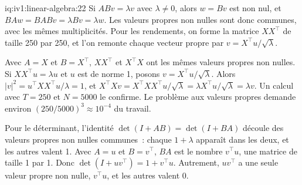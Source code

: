 \begin{solution}{iq:iv1:linear-algebra:22}
Si $ABv = \lambda v$ avec $\lambda \ne 0$, alors $w = Bv$ est non nul, et $BAw = BABv = \lambda Bv = \lambda w$. Les valeurs propres non nulles sont donc communes, avec les mêmes multiplicités. Pour les rendements, on forme la matrice $XX^\top$ de taille 250 par 250, et l'on remonte chaque vecteur propre par $v = X^\top u/\sqrt{\lambda}$.

Avec $A = X$ et $B = X^\top$, $XX^\top$ et $X^\top X$ ont les mêmes valeurs propres non nulles. Si $XX^\top u = \lambda u$ et $u$ est de norme 1, posons $v = X^\top u/\sqrt{\lambda}$. Alors $|v|^2 = u^\top XX^\top u/\lambda = 1$, et $X^\top Xv = X^\top XX^\top u/\sqrt{\lambda} = \lambda X^\top u/\sqrt{\lambda} = \lambda v$. Un calcul avec $T = 250$ et $N = 5000$ le confirme. Le problème aux valeurs propres demande environ $(250/5000)^3 \approx 10^{-4}$ du travail.

Pour le déterminant, l'identité $\det(I + AB) = \det(I + BA)$ découle des valeurs propres non nulles communes~: chaque $1 + \lambda$ apparaît dans les deux, et les autres valent 1. Avec $A = u$ et $B = v^\top$, $BA$ est le nombre $v^\top u$, une matrice de taille 1 par 1. Donc $\det(I + uv^\top) = 1 + v^\top u$. Autrement, $uv^\top$ a une seule valeur propre non nulle, $v^\top u$, et les autres valent 0.

\end{solution}

